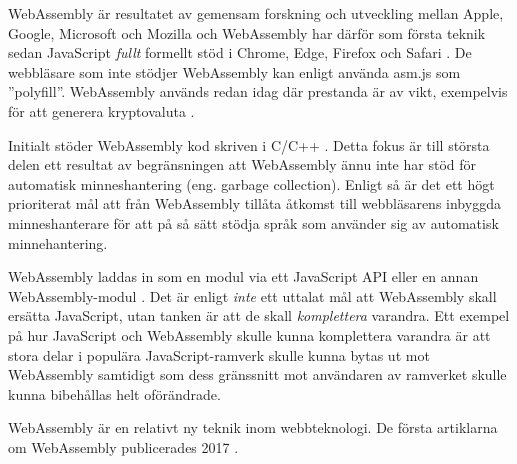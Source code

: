 WebAssembly är resultatet av gemensam forskning och utveckling mellan  Apple, Google, Microsoft och Mozilla \parencite{HaasRossbergSchuffTitzerHolmanGohmanWagnerZakaiBastien2017} och WebAssembly har därför som första teknik sedan JavaScript \emph{fullt} formellt stöd i Chrome, Edge, Firefox och Safari \parencite{Moller2018}. De webbläsare som inte stödjer WebAssembly kan enligt \textcite{HaasRossbergSchuffTitzerHolmanGohmanWagnerZakaiBastien2017} använda asm.js  som ''polyfill''. WebAssembly används redan idag där prestanda är av vikt, exempelvis för att generera kryptovaluta \parencite{RuthZimmermannWolsingHohlfeld2018}.

Initialt stöder WebAssembly kod skriven i C/C++ \parencite{HaasRossbergSchuffTitzerHolmanGohmanWagnerZakaiBastien2017}. Detta fokus är till största delen ett resultat av begränsningen att WebAssembly ännu inte har stöd för automatisk minneshantering (eng. garbage collection). Enligt \textcite{HaasRossbergSchuffTitzerHolmanGohmanWagnerZakaiBastien2017} så är det ett högt prioriterat mål att från WebAssembly tillåta åtkomst till webbläsarens inbyggda minneshanterare för att på så sätt stödja språk som använder sig av automatisk minnehantering.

WebAssembly laddas in som en modul via ett JavaScript API eller en annan WebAssembly-modul \parencite{HaasRossbergSchuffTitzerHolmanGohmanWagnerZakaiBastien2017}. Det är enligt \textcite{Moller2018} \emph{inte} ett uttalat mål att WebAssembly skall ersätta JavaScript, utan tanken är att de skall \emph{komplettera} varandra. Ett exempel på hur JavaScript och WebAssembly skulle kunna komplettera varandra är att stora delar i populära JavaScript-ramverk skulle kunna bytas ut mot WebAssembly samtidigt som dess gränssnitt mot användaren av ramverket skulle kunna bibehållas helt oförändrade.

WebAssembly är en relativt ny teknik inom webbteknologi. De första artiklarna om WebAssembly publicerades 2017 \parencite{HaasRossbergSchuffTitzerHolmanGohmanWagnerZakaiBastien2017,ReiserBlaser2017}.
